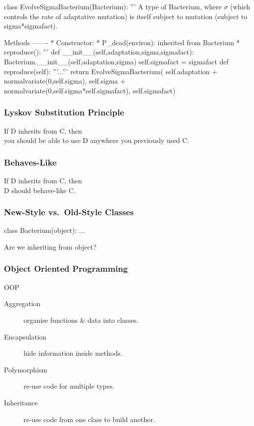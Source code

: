 \begin{frame}[fragile]

\begin{python}
class EvolveSigmaBacterium(Bacterium):
    '''
    A type of Bacterium, where $\sigma$ (which controls
    the rate of adaptative mutation) is itself subject
    to mutation (subject to sigma*sigmafact).

    Methods
    -------
        * Constructor:
        * P_dead(environ): inherited from Bacterium
        * reproduce(): 
    '''
    def __init__(self,adaptation,sigma,sigmafact):
        Bacterium.__init__(self,adaptation,sigma)
        self.sigmafact = sigmafact
    def reproduce(self):
        '''...'''
        return EvolveSigmaBacterium(
           self.adaptation + normalvariate(0,self.sigma),
           self.sigma + normalvariate(0,self.sigma*self.sigmafact),
           self.sigmafact)
\end{python}
\end{frame}

\begin{frame}[fragile]
\frametitle{Lyskov Substitution Principle}

If D inherits from C, then\\
you should be able to use D anywhere you previously used C.

\end{frame}

\begin{frame}[fragile]
\frametitle{Behaves-Like}

If D inherits from C, then\\
D should behave-like C.

\end{frame}

\begin{frame}[fragile]
\frametitle{New-Style vs.\ Old-Style Classes}
\begin{python}
class Bacterium(object):
    ...
\end{python}

Are we inheriting from \alert{object}?
\end{frame}


\begin{frame}[fragile] 
\frametitle{Object Oriented Programming}

\begin{block}{OOP}
\begin{description}
\item[\alert{Aggregation}] organise functions \& data into classes.
\item[\alert{Encapsulation}] hide information inside methods.
\item[\alert{Polymorphism}] re-use code for multiple types.
\item[\alert{Inheritance}] re-use code from one class to build another.
\end{description}
\end{block}
\end{frame}


